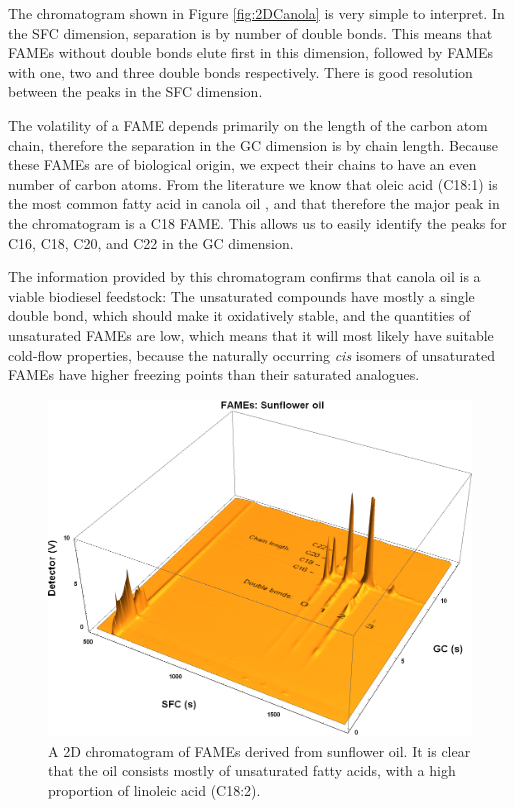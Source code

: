 The chromatogram shown in Figure \ref{fig:2DCanola} is very simple to interpret.
In the SFC dimension, separation is by number of double bonds.
This means that FAMEs without double bonds elute first in this dimension,
followed by FAMEs with one, two and three double bonds respectively. There is
good resolution between the peaks in the SFC dimension.

The volatility of a FAME depends primarily on the length of the carbon atom
chain, therefore the separation in the GC dimension is by chain length. Because
these FAMEs are of biological origin, we expect their chains to have an even
number of carbon atoms. From the literature we know that oleic acid (C18:1) is
the most common fatty acid in canola oil \autocite{JFAOWHOCAC2019}, and that
therefore the major peak in the chromatogram is a C18 FAME. This allows us to
easily identify the peaks for C16, C18, C20, and C22 in the GC dimension.

The information provided by this chromatogram confirms that canola oil is a
vi\-able bio\-diesel feedstock: The unsaturated compounds have mostly a single
double bond, which should make it oxidatively stable, and the quantities of
unsaturated FAMEs are low, which means that it will most likely have suitable
cold-flow properties, because the naturally occurring \textit{cis} isomers of
unsaturated FAMEs have higher freezing points than their saturated analogues.

\begin{figure}
\centering
\includegraphics[width=\textwidth]{Figures/Sunflower.png}
\decoRule

\caption[SFC×GC of sunflower oil]{A 2D chromatogram of FAMEs derived from
sunflower oil. It is clear that the oil consists mostly of unsaturated fatty
acids, with a high proportion of linoleic acid (C18:2).}

\label{fig:2DSunflower}
\end{figure}

